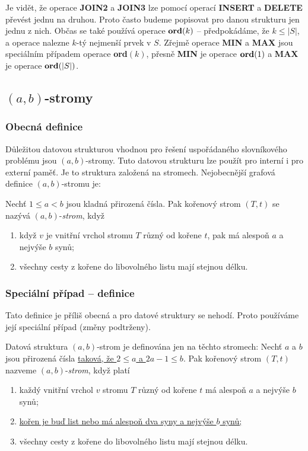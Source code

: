 \documentclass[a4paper,12pt]{article}
\begin{document}
Je vidět, že operace {\bf JOIN2} a {\bf JOIN3} lze pomocí ope\-rací 
{\bf INSERT} a {\bf DELETE} převést jednu na druhou. Proto často budeme 
popisovat pro danou strukturu jen jednu z nich. 
Občas se také používá operace\newline 
$\bold o\bold r\bold d(k)$ -- předpokádáme, že $k\le |S
|$, a operace nalezne $k$-tý 
nejmenší prvek v $S$.\newline 
Zřejmě operace {\bf MIN} a {\bf MAX} jsou speciálním případem 
ope\-race {\bf ord$(k)$}, 
přesně {\bf MIN} je operace $\bold o\bold r\bold d(1)$ a {\bf MAX} je operace $
\bold o\bold r\bold d(|S|)$.

\subsection{$(a,b)$-stromy}

\subsubsection{Obecná definice}
Důležitou datovou strukturou vhodnou pro 
řešení uspořá\-dané\-ho slovní\-ko\-vé\-ho problému jsou 
$(a,b)$-stromy. Tuto datovou strukturu lze použít pro interní i 
pro externí paměť. Je to struktura založená na stromech. 
Nejobecnější grafová defini\-ce $(a,b)$-stromu je:

 
Nechť $1\le a<b$ jsou kladná přirozená čísla. Pak kořenový 
strom $(T,t)$ se nazývá $(a,b)$-\emph{strom}, když 
\begin{enumerate}
\item
když $v$ je vnitřní vrchol stromu $T$ různý od 
kořene $t$, pak má alespoň $a$ a nejvýše $b$ synů;
\item
všechny cesty z kořene do libovolného listu mají 
stejnou délku.
\end{enumerate}

\subsubsection{Speciální případ -- definice}
Tato definice je příliš obecná a pro datové struktury se 
nehodí. Proto používáme její speciální případ (změny podtrženy). 

Datová 
struktura $(a,b)$-strom je definována jen na těchto stromech: 
Nechť $a$ a $b$ jsou přirozená čísla \underline{taková, že $
2\le a$ a 
$2a-1\le b$}. Pak kořenový 
strom $(T,t)$ nazveme $(a,b)$-\emph{strom}, když platí 
\begin{enumerate}
\item
každý vnitřní vrchol $v$ stromu $T$ různý od 
kořene $t$ má alespoň $a$ a nejvýše $b$ synů;
\item
\underline{kořen je buď list nebo má alespoň dva syny a nejvýše $
b$ 
synů;}
\item
všechny cesty z kořene do libovolného listu mají 
stejnou délku.
\end{enumerate}
\end{document}
